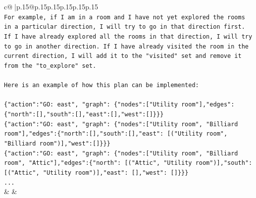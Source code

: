 \documentclass{article}
\begin{document}
{\begin{supertabular}{c@{$\;$}|p{.15\linewidth}@{}p{.15\linewidth}p{.15\linewidth}p{.15\linewidth}p{.15\linewidth}p{.15\linewidth}}
{{{\\ 
\texttt{For example, if I am in a room and I have not yet explored the rooms in a particular direction, I will try to go in that direction first. If I have already explored all the rooms in that direction, I will try to go in another direction. If I have already visited the room in the current direction, I will add it to the "visited" set and remove it from the "to\_explore" set.} \\
\\ 
\texttt{Here is an example of how this plan can be implemented:} \\
\\ 
\texttt{\{"action":"GO: east", "graph": \{"nodes":{[}"Utility room"{]},"edges":\{"north":{[}{]},"south":{[}{]},"east":{[}{]},"west":{[}{]}\}\}\}} \\
\texttt{\{"action":"GO: east", "graph": \{"nodes":{[}"Utility room", "Billiard room"{]},"edges":\{"north":{[}{]},"south":{[}{]},"east": {[}("Utility room", "Billiard room"){]},"west":{[}{]}\}\}\}} \\
\texttt{\{"action":"GO: east", "graph": \{"nodes":{[}"Utility room", "Billiard room", "Attic"{]},"edges":\{"north": {[}("Attic", "Utility room"){]},"south": {[}("Attic", "Utility room"){]},"east": {[}{]},"west": {[}{]}\}\}\}} \\
\texttt{...} \\
            }
        }
    }
    & & \\ \\

\end{supertabular}
}
\end{document}
